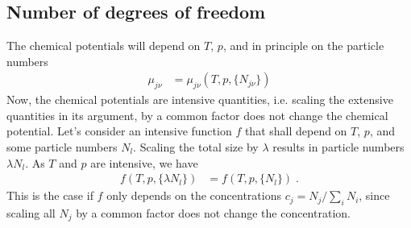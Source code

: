 \subsection{Number of degrees of freedom}
The chemical potentials will depend on $T$, $p$, and in principle on the particle numbers
%
\begin{align}\label{eq:}
\mu_{j\nu} &=\mu_{j\nu}(T,p,\{N_{j\nu}\})
\end{align}
%
Now, the chemical potentials are intensive quantities, i.e. scaling the extensive quantities in its argument, by a common factor does not change the chemical potential. Let's consider an intensive function
$f$ that shall depend on $T$, $p$, and some particle numbers $N_{l}$. Scaling the total size
by $\lambda$ results in particle numbers $\lambda N_{l}$. As $T$ and $p$ are intensive,
we have 
%
\begin{align*}
f(T,p,\{\lambda N_{l}\}) &= f(T,p,\{N_{l}\})\;.
\end{align*}
%
This is the case if $f$ only depends on the concentrations $c_{j}=N_{j}/\sum_{i} N_{i}$, since
scaling all $N_{j}$ by a common factor does not change the concentration.


